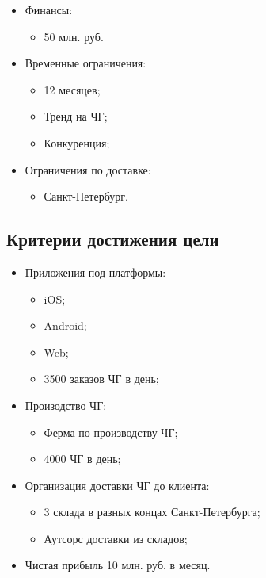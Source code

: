 \documentclass[a4paper,10pt]{article}
\begin{document}
    \begin{itemize}
        \item Финансы:
            \begin{itemize}
                \item 50 млн. руб.
            \end{itemize}
        \item Временные ограничения:
            \begin{itemize}
                \item 12 месяцев;
                \item Тренд на ЧГ;
                \item Конкуренция;
            \end{itemize}
        \item Ограничения по доставке:
            \begin{itemize}
                \item Санкт-Петербург.
            \end{itemize}
    \end{itemize}

\subsection{Критерии достижения цели}

    \begin{itemize}
        \item Приложения под платформы:
            \begin{itemize}
                \item iOS;
                \item Android;
                \item Web;
                \item 3500 заказов ЧГ в день;
            \end{itemize}
        \item Произодство ЧГ:
            \begin{itemize}
                \item Ферма по производству ЧГ;
                \item 4000 ЧГ в день;
            \end{itemize}
        \item Организация доставки ЧГ до клиента:
            \begin{itemize}
                \item 3 склада в разных концах Санкт-Петербурга;
                \item Аутсорс доставки из складов;
            \end{itemize}
        \item Чистая прибыль 10 млн. руб. в месяц.
    \end{itemize}
\end{document}
